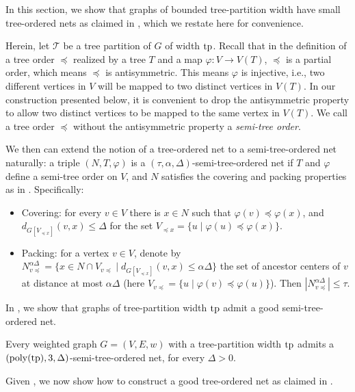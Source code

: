 \documentclass{theoretics}
\newcommand{\tp}{{\rm tp}}
\newcommand{\poly}{\mathrm{poly}}
\begin{document}
In this section, we show that graphs of bounded tree-partition width have small tree-ordered nets as claimed in , which we restate here for convenience. 

\NetMainLemma*

Herein, let $\mathcal{T}$ be a tree partition of $G$ of width $\tp$. Recall that in the definition of a tree order $\preceq$ realized by a tree $T$ and a map $\varphi: V\rightarrow V(T)$, $\preceq$  is a partial order, which means $\preceq$ is antisymmetric. This means $\varphi$ is injective, i.e., two different vertices in $V$ will be mapped to two distinct vertices in $V(T)$. In our construction presented below, it is convenient to drop the antisymmetric property to allow two distinct vertices to be mapped to the same vertex in $V(T)$. We call a tree order $\preceq$ without the antisymmetric property a \emph{semi-tree order}. 

We then can extend the notion of a tree-ordered net to a semi-tree-ordered net naturally:  a triple $(N,T,\varphi)$ is a $(\tau,\alpha,\Delta)$-semi-tree-ordered net if $T$ and $\varphi$ define a semi-tree order on $V$, and $N$ satisfies the covering  and packing properties as in . Specifically:
\begin{itemize}
	\item Covering: for every $v\in V$ there is $x\in N$ such that $\varphi(v)\preceq\varphi(x)$, and $d_{G[V_{\preceq x}]}(v,x)\le \Delta$ for the set $V_{\preceq x}=\{u\mid \varphi(u)\preceq\varphi(x)\}$.
	\item Packing: for a vertex $v\in V$, denote by $N_{v \preceq}^{\alpha\Delta}=\{x\in N\cap V_{v\preceq}\mid d_{G[V_{\preceq x}]}(v,x)\le \alpha\Delta\}$ the set of ancestor centers of $v$ at distance at most $\alpha\Delta$ (here  $V_{v\preceq }=\{u\mid \varphi(v)\preceq\varphi(u)\}$). Then $|N_{v \preceq}^{\alpha\Delta}|\le\tau$. 
	

\end{itemize}
 In , we show that graphs of tree-partition width $\tp$ admit a good semi-tree-ordered net. 

\begin{lemma} \label{lem:SeminTreeOrderNetLemma}	
	Every weighted graph  $G=(V,E,w)$ with a tree-partition width $\tp$ admits a $(\poly(\tp),3,\Delta)$-semi-tree-ordered net, for every $\Delta>0$.    
\end{lemma}

Given , we now show how to construct a good tree-ordered net as claimed in  .
\end{document}
